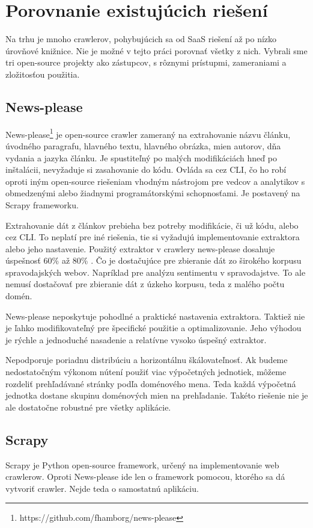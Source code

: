 \section{Porovnanie existujúcich riešení} 
Na trhu je mnoho crawlerov, pohybujúcich sa od SaaS riešení až po nízko úrovňové knižnice. Nie je možné v tejto práci porovnať všetky z nich. Vybrali sme tri open-source projekty ako zástupcov, s rôznymi prístupmi, zameraniami a zložitosťou použitia.

\subsection{News-please}
News-please\footnote{https://github.com/fhamborg/news-please} je open-source crawler zameraný na extrahovanie názvu článku, úvodného paragrafu, hlavného textu, hlavného obrázka, mien autorov, dňa vydania a jazyka článku. Je spustiteľný po malých modifikáciách hneď po inštalácii, nevyžaduje si zasahovanie do kódu. Ovláda sa cez CLI, čo ho robí oproti iným open-source riešeniam vhodným nástrojom pre vedcov a analytikov s obmedzenými alebo žiadnymi programátorskými schopnosťami. Je postavený na Scrapy frameworku. 

Extrahovanie dát z článkov prebieha bez potreby modifikácie, či už kódu, alebo cez CLI. To neplatí pre iné riešenia, tie si vyžadujú implementovanie extraktora alebo jeho nastavenie. Použitý extraktor v crawlery news-please dosahuje úspešnosť 60\% až 80\% \cite{newsPlease}. Čo je dostačujúce pre zbieranie dát zo širokého korpusu spravodajských webov. Napríklad pre analýzu sentimentu v spravodajstve. To ale nemusí dostačovať pre zbieranie dát z úzkeho korpusu, teda z malého počtu domén. 

News-please neposkytuje pohodlné a praktické nastavenia extraktora. Taktiež nie je ľahko modifikovateľný pre špecifické použitie a optimalizovanie. Jeho výhodou je rýchle a jednoduché nasadenie a relatívne vysoko úspešný extraktor. 

Nepodporuje poriadnu distribúciu a horizontálnu škálovateľnosť. Ak budeme nedostatočným výkonom nútení použiť viac výpočetných jednotiek, môžeme rozdeliť prehľadávané stránky podľa doménového mena. Teda každá výpočetná jednotka dostane skupinu doménových mien na prehľadanie. Takéto riešenie nie je ale dostatočne robustné pre všetky aplikácie. 

\subsection{Scrapy} 
Scrapy je Python open-source framework, určený na implementovanie web crawlerow. Oproti News-please ide len o framework pomocou, ktorého sa dá vytvoriť crawler. Nejde teda o samostatnú aplikáciu. 

